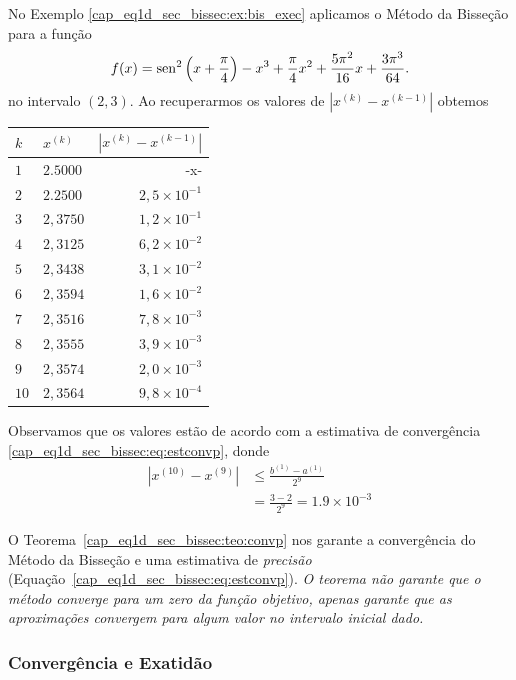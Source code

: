 \begin{ex}\label{cap_eq1d_sec_bissec:ex:bis_convp}
  No Exemplo \ref{cap_eq1d_sec_bissec:ex:bis_exec} aplicamos o Método da Bisseção para a função
\begin{equation}
  f(x) = \operatorname{sen}^2\left(x+\frac{\pi}{4}\right) - x^3 + \frac{\pi}{4}x^2 + \frac{5\pi^2}{16}x + \frac{3\pi^3}{64}.
\end{equation}
no intervalo $(2, 3)$. Ao recuperarmos os valores de $\left|x^{(k)}-x^{(k-1)}\right|$ obtemos
\begin{center}
  \begin{tabular}[H]{l|l|r}
    $k$ & $x^{(k)}$ & $\left|x^{(k)}-x^{(k-1)}\right|$\\\hline
    $1$ & $2.5000$ & -x-\\
    $2$ & $2.2500$ & $2,5\times 10^{-1}$\\
    $3$ & $2,3750$ & $1,2\times 10^{-1}$\\
    $4$ & $2,3125$ & $6,2\times 10^{-2}$\\
    $5$ & $2,3438$ & $3,1\times 10^{-2}$\\
    $6$ & $2,3594$ & $1,6\times 10^{-2}$\\
    $7$ & $2,3516$ & $7,8\times 10^{-3}$\\
    $8$ & $2,3555$ & $3,9\times 10^{-3}$\\
    $9$ & $2,3574$ & $2,0\times 10^{-3}$\\
    $10$ & $2,3564$ & $9,8\times 10^{-4}$\\\hline
  \end{tabular}
\end{center}

Observamos que os valores estão de acordo com a estimativa de convergência \ref{cap_eq1d_sec_bissec:eq:estconvp}, donde
\begin{align}
  |x^{(10)}-x^{(9)}| &\leq \frac{b^{(1)}-a^{(1)}}{2^{9}}\\
                     &= \frac{3 - 2}{2^{9}} = 1.9\times 10^{-3}
\end{align}
\end{ex}

O Teorema~\ref{cap_eq1d_sec_bissec:teo:convp} nos garante a convergência do Método da Bisseção e uma estimativa de \emph{precisão} (Equação~\ref{cap_eq1d_sec_bissec:eq:estconvp}). \emph{O teorema não garante que o método converge para um zero da função objetivo, apenas garante que as aproximações convergem para algum valor no intervalo inicial dado.}

\subsubsection{Convergência e Exatidão}

